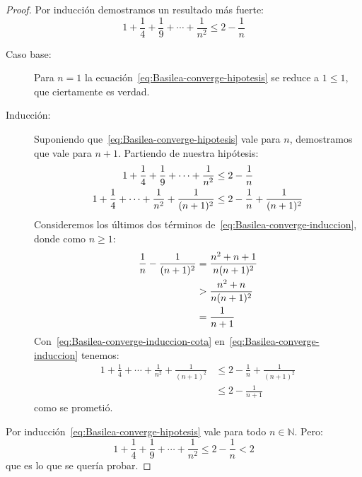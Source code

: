   \begin{proof}
    Por inducción demostramos un resultado más fuerte:
    \begin{equation}
      \label{eq:Basilea-converge-hipotesis}
      1 + \frac{1}{4} + \frac{1}{9} + \dotsb + \frac{1}{n^2}
	\le 2 - \frac{1}{n}
    \end{equation}
    \begin{description}
    \item[Caso base:]
      Para \(n = 1\) la ecuación~\eqref{eq:Basilea-converge-hipotesis}
      se reduce a \(1 \le 1\),
      que ciertamente es verdad.
    \item[Inducción:]
      Suponiendo que~\eqref{eq:Basilea-converge-hipotesis}
      vale para \(n\),
      demostramos que vale para \mbox{\(n + 1\)}.
      Partiendo de nuestra hipótesis:
      \begin{align}
	1 + \frac{1}{4} + \frac{1}{9} + \dotsb + \frac{1}{n^2}
	  &\le 2 - \frac{1}{n} \notag \\
	1 + \frac{1}{4}
	  + \dotsb + \frac{1}{n^2} + \frac{1}{(n + 1)^2}
	  &\le 2 - \frac{1}{n} + \frac{1}{(n + 1)^2}
	  \label{eq:Basilea-converge-induccion}
      \end{align}
      Consideremos los últimos dos términos
      de~\eqref{eq:Basilea-converge-induccion},
      donde como \(n \ge 1\):
      \begin{align}
	\frac{1}{n} - \frac{1}{(n + 1)^2}
	  &= \frac{n^2 + n + 1}{n (n + 1)^2} \notag \\
	  &> \frac{n^2 + n}{n (n + 1)^2} \notag \\
	  &= \frac{1}{n + 1}
	  \label{eq:Basilea-converge-induccion-cota}
      \end{align}
      Con~\eqref{eq:Basilea-converge-induccion-cota}
      en~\eqref{eq:Basilea-converge-induccion}
      tenemos:
      \begin{align*}
	1 + \frac{1}{4}
	  + \dotsb + \frac{1}{n^2} + \frac{1}{(n + 1)^2}
	  &\le 2 - \frac{1}{n} + \frac{1}{(n + 1)^2} \\
	  &\le 2 - \frac{1}{n + 1}
      \end{align*}
      como se prometió.
    \end{description}
    Por inducción~\eqref{eq:Basilea-converge-hipotesis}
    vale para todo \(n \in \mathbb{N}\).
    Pero:
    \begin{equation*}
      1 + \frac{1}{4} + \frac{1}{9} + \dotsb + \frac{1}{n^2}
	\le 2 - \frac{1}{n} < 2
    \end{equation*}
    que es lo que se quería probar.
  \end{proof}

